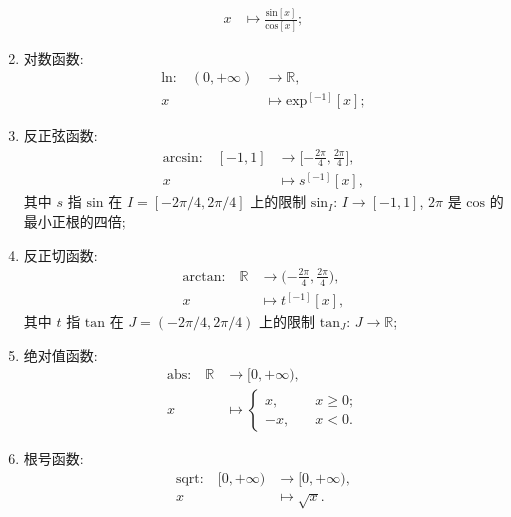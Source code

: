 \begin{definition}
\begin{enumerate}
\begin{align*}
                  x                                      & \mapsto \frac{\mathrm{sin} {[x]}} {\mathrm{cos} {[x]}};
              \end{align*}
        \item 对数函数:
              \begin{align*}
                  \text{$\mathrm{ln}$:} \quad
                  (0, +\infty) & \to \mathbb{R},                    \\
                  x            & \mapsto \mathrm{exp}^{[-1]} {[x]};
              \end{align*}
        \item 反正弦函数:
              \begin{align*}
                  \text{$\mathrm{arcsin}$:} \quad
                  [-1, 1] & \to \bigg[ {-\frac{2\pi}{4}}, \frac{2\pi}{4} \bigg], \\
                  x       & \mapsto s^{[-1]} {[x]},
              \end{align*}
              其中 $s$ 指 $\mathrm{sin}$ 在
              $I = [-2\pi/4, 2\pi/4]$ 上的限制
              $\mathrm{sin}_I$: $I \to [-1, 1]$,
              $2\pi$ 是 $\mathrm{cos}$ 的最小正根的四倍;
        \item 反正切函数:
              \begin{align*}
                  \text{$\mathrm{arctan}$:} \quad
                  \mathbb{R} & \to \bigg( {-\frac{2\pi}{4}}, \frac{2\pi}{4} \bigg), \\
                  x          & \mapsto t^{[-1]} {[x]},
              \end{align*}
              其中 $t$ 指 $\mathrm{tan}$ 在
              $J = (-2\pi/4, 2\pi/4)$ 上的限制
              $\mathrm{tan}_J$: $J \to \mathbb{R}$;
        \item 绝对值函数:
              \begin{align*}
                  \text{$\mathrm{abs}$:} \quad
                  \mathbb{R} & \to [0, +\infty),             \\
                  x          & \mapsto \begin{cases}
                                           x,  & \quad x \geq 0; \\
                                           -x, & \quad x < 0.
                                       \end{cases}
              \end{align*}
        \item 根号函数:
              \begin{align*}
                  \text{$\mathrm{sqrt}$:} \quad
                  [0, +\infty) & \to [0, +\infty), \\
                  x            & \mapsto \sqrt{x}.
              \end{align*}
    \end{enumerate}
\end{definition}

